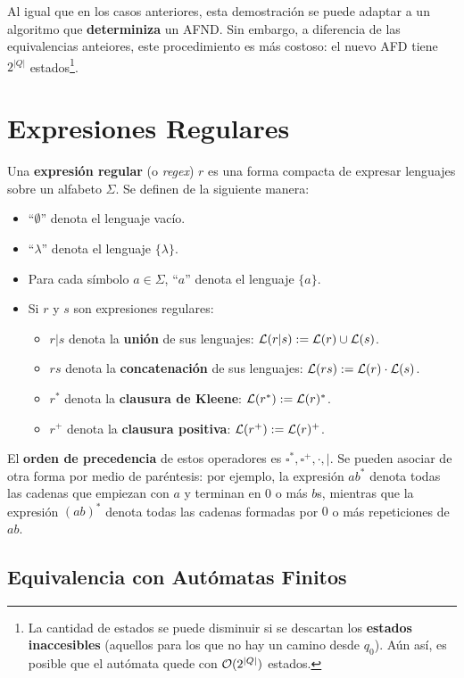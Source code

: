 Al igual que en los casos anteriores, esta demostración se puede adaptar a un algoritmo que \textbf{determiniza} un AFND. Sin embargo, a diferencia de las equivalencias anteiores, este procedimiento es más costoso: el nuevo AFD tiene $2^{|Q|}$ estados\footnote{La cantidad de estados se puede disminuir si se descartan los \textbf{estados inaccesibles} (aquellos para los que no hay un camino desde $q_0$). Aún así, es posible que el autómata quede con $\mathcal{O}(2^{|Q|})$ estados.}.

\section{Expresiones Regulares}

Una \textbf{expresión regular} (o \textit{regex}) $r$ es una forma compacta de expresar lenguajes sobre un alfabeto $\Sigma$. Se definen de la siguiente manera:
\begin{itemize}
    \item ``$\emptyset$'' denota el lenguaje vacío.
    \item ``$\lambda$'' denota el lenguaje $\{\lambda\}$.
    \item Para cada símbolo $a \in \Sigma$, ``$a$'' denota el lenguaje $\{a\}$.
    \item Si $r$ y $s$ son expresiones regulares:
    \begin{itemize}
        \item $r|s$ denota la \textbf{unión} de sus lenguajes: $\mathcal{L}(r|s) := \mathcal{L}(r) \cup \mathcal{L}(s)$.
        \item $rs$ denota la \textbf{concatenación} de sus lenguajes: $\mathcal{L}(rs) := \mathcal{L}(r) \cdot \mathcal{L}(s)$.
        \item $r^*$ denota la \textbf{clausura de Kleene}: $\mathcal{L}(r^*) := \mathcal{L}(r)^*$.
        \item $r^+$ denota la \textbf{clausura positiva}: $\mathcal{L}(r^+) := \mathcal{L}(r)^+$.
    \end{itemize}
\end{itemize}

El \textbf{orden de precedencia} de estos operadores es $\square^*, \square^+, \cdot, |$. Se pueden asociar de otra forma por medio de paréntesis: por ejemplo, la expresión $ab^*$ denota todas las cadenas que empiezan con $a$ y terminan en 0 o más $b$s, mientras que la expresión $(ab)^*$ denota todas las cadenas formadas por $0$ o más repeticiones de $ab$.

\subsection{Equivalencia con Autómatas Finitos}

